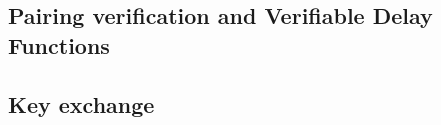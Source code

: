 \documentclass{beamer}
\renewcommand{\emph}[1]{{\usebeamercolor[fg]{structure}#1}}
\begin{document}




\subsection{Pairing verification and Verifiable Delay Functions}


\subsection{Key exchange}

      
\end{document}
